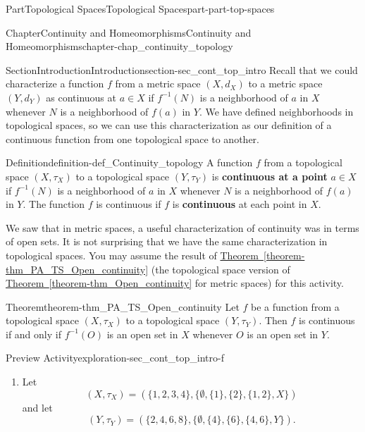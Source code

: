 \documentclass[oneside,10pt,]{book}
\newcommand{\xreffont}{\relax}
\newcommand{\terminology}[1]{\textbf{#1}}
\numberwithin{equation}{chapter}
\begin{document}
\begin{partptx}{Part}{Topological Spaces}{}{Topological Spaces}{}{}{part-part-top-spaces}
\begin{chapterptx}{Chapter}{Continuity and Homeomorphisms}{}{Continuity and Homeomorphisms}{}{}{chapter-chap_continuity_topology}
\typeout{************************************************}
%
\begin{sectionptx}{Section}{Introduction}{}{Introduction}{}{}{section-sec_cont_top_intro}
Recall that we could characterize a function \(f\) from a metric space \((X,d_X)\) to a metric space \((Y,d_Y)\) as continuous at \(a \in X\) if \(f^{-1}(N)\) is a neighborhood of \(a\) in \(X\) whenever \(N\) is a neighborhood of \(f(a)\) in \(Y\). We have defined neighborhoods in topological spaces, so we can use this characterization as our definition of a continuous function from one topological space to another.%
\begin{definition}{Definition}{}{definition-def_Continuity_topology}%
%
A function \(f\) from a topological space \((X, \tau_X)\) to a topological space \((Y, \tau_Y)\) is \terminology{continuous at a point} \(a \in X\) if \(f^{-1}(N)\) is a neighborhood of \(a\) in \(X\) whenever \(N\) is a neighborhood of \(f(a)\) in \(Y\). The function \(f\) is continuous if \(f\) is \terminology{continuous} at each point in \(X\).%
\end{definition}
We saw that in metric spaces, a useful characterization of continuity was in terms of open sets. It is not surprising that we have the same characterization in topological spaces. You may assume the result of \hyperref[theorem-thm_PA_TS_Open_continuity]{Theorem~{\xreffont\ref{theorem-thm_PA_TS_Open_continuity}}} (the topological space version of \hyperref[theorem-thm_Open_continuity]{Theorem~{\xreffont\ref{theorem-thm_Open_continuity}}} for metric spaces) for this activity.%
\begin{theorem}{Theorem}{}{}{theorem-thm_PA_TS_Open_continuity}%
Let \(f\) be a function from a topological space \((X,\tau_X)\) to a topological space \((Y,\tau_Y)\). Then \(f\) is continuous if and only if \(f^{-1}(O)\) is an open set in \(X\) whenever \(O\) is an open set in \(Y\).%
\end{theorem}
\begin{exploration}{Preview Activity}{}{exploration-sec_cont_top_intro-f}%
\begin{enumerate}[font=\bfseries,label=(\alph*),ref=\alph*]%
\item{}Let%
\begin{equation*}
(X, \tau_X) = (\{1,2,3,4\}, \{\emptyset, \{1\}, \{2\}, \{1,2\}, X \})
\end{equation*}
and let%
\begin{equation*}
(Y, \tau_Y) = (\{2,4,6,8\}, \{\emptyset, \{4\}, \{6\}, \{4,6\}, Y\})\text{.}

\end{equation*}
\end{enumerate}
\end{exploration}
\end{sectionptx}
\end{chapterptx}
\end{partptx}
\end{document}
